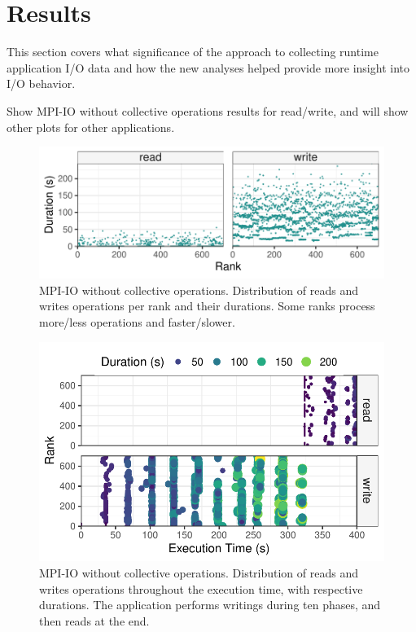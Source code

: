 \section{Results}


This section covers what significance of the approach to collecting runtime application I/O data and how the new analyses helped provide more insight into I/O behavior.

Show MPI-IO without collective operations results for read/write, and
will show other plots for other applications.


\begin{figure}
	\centering
        \includegraphics[width=\linewidth]{figs/255653_mpi_io_luster_no_coll_duration_nocolor.pdf}
	\caption{MPI-IO without collective operations. Distribution of reads and writes operations per rank
          and their durations. Some ranks process more/less operations
          and faster/slower.}
	\label{f:mpi_io}
\end{figure}

\begin{figure}
	\centering
	\includegraphics[width=\linewidth]{figs/255653_mpi_io_luster_no_coll_execution2.pdf}
	\caption{MPI-IO without collective operations. Distribution of reads and writes operations
          throughout the execution time, with respective
          durations. The application performs writings during ten
          phases, and then reads at the end.}
	\label{f:mpi_io}
\end{figure}

